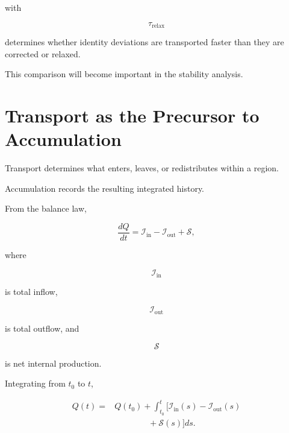 \documentclass[12pt,oneside]{book}
\begin{document}
with

\begin{equation}
    \tau_{\mathrm{relax}}
\end{equation}

determines whether identity deviations are transported faster
than they are corrected or relaxed.

This comparison will become important in the stability analysis.


\section{Transport as the Precursor to Accumulation}
\label{sec:transport-accumulation}

Transport determines what enters, leaves, or redistributes
within a region.

Accumulation records the resulting integrated history.

From the balance law,

\begin{equation}
    \frac{dQ}{dt}
    =
    \mathcal{I}_{\mathrm{in}}
    -
    \mathcal{I}_{\mathrm{out}}
    +
    \mathcal{S},
    \label{eq:inflow-outflow-balance}
\end{equation}

where

\begin{equation}
    \mathcal{I}_{\mathrm{in}}
\end{equation}

is total inflow,

\begin{equation}
    \mathcal{I}_{\mathrm{out}}
\end{equation}

is total outflow, and

\begin{equation}
    \mathcal{S}
\end{equation}

is net internal production.

Integrating from \(t_0\) to \(t\),

\begin{equation}
\begin{aligned}
    Q(t)
    ={}&
    Q(t_0)
    +
    \int_{t_0}^{t}
    \Big[
        \mathcal{I}_{\mathrm{in}}(s)
        -
        \mathcal{I}_{\mathrm{out}}(s)
        \\
        &\qquad\qquad
        +
        \mathcal{S}(s)
    \Big]
    ds.
\end{aligned}
\label{eq:transport-accumulation-integral}
\end{equation}
\end{document}
